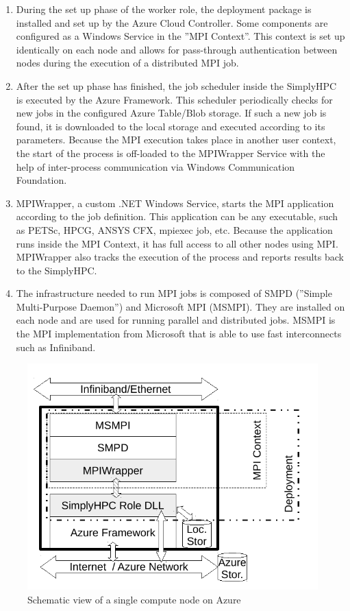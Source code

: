 \documentclass[3p,times]{elsarticle}
\begin{document}
\begin{enumerate}
	\item During the set up phase of the worker role, the deployment package is installed and set up by the Azure Cloud Controller. Some components are configured as a Windows Service in the ''MPI Context''. This context is set up identically on each node and allows for pass-through authentication between nodes during the execution of a distributed MPI job.

	\item After the set up phase has finished, the job scheduler inside the SimplyHPC is executed by the Azure Framework. This scheduler periodically checks for new jobs in the configured Azure Table/Blob storage. If such a new job is found, it is downloaded to the local storage and executed according to its parameters. Because the MPI execution takes place in another user context, the start of the process is off-loaded to the MPIWrapper Service with the help of inter-process communication via Windows Communication Foundation.

	\item MPIWrapper, a custom .NET Windows Service, starts the MPI application according to the job definition. This application can be any executable, such as PETSc, HPCG, ANSYS CFX, mpiexec job, etc. Because the application runs inside the MPI Context, it has full access to all other nodes using MPI. MPIWrapper also tracks the execution of the process and reports results back to the SimplyHPC.

	\item The infrastructure needed to run MPI jobs is composed of SMPD (''Simple Multi-Purpose Daemon'') and Microsoft MPI (MSMPI). They are installed on each node and are used for running parallel and distributed jobs. MSMPI is the MPI implementation from Microsoft that is able to use fast interconnects such as Infiniband.
\end{enumerate}

\begin{figure}[h]
	\centering
	\includegraphics[width=.5\linewidth]{azureWorkerRole.pdf}
	\caption{Schematic view of a single compute node on Azure}

	\label{fig:schemaRole}
\end{figure}
\end{document}
